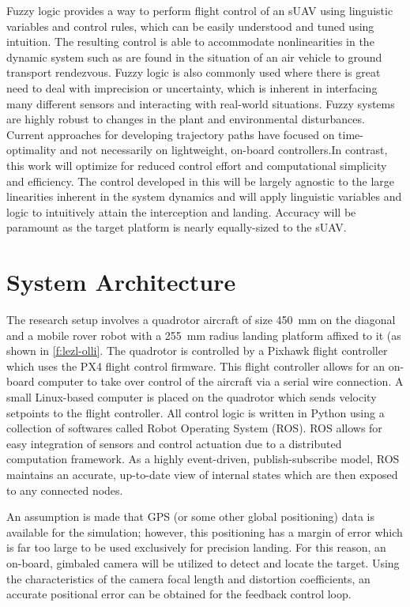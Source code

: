 \documentclass[]{aiaa-tc}
\begin{document}
Fuzzy logic provides a way to perform flight control of an sUAV using linguistic variables and control rules, which can be easily understood and tuned using intuition\cite{MAMDANI19751}. The resulting control is able to accommodate nonlinearities in the dynamic system such as are found in the situation of an air vehicle to ground transport rendezvous\cite{Ionita_2005}. Fuzzy logic is also commonly used where there is great need to deal with imprecision or uncertainty\cite{Matlab_fuzzy_tb,lee1990fuzzy}, which is inherent in interfacing many different sensors and interacting with real-world situations. Fuzzy systems are highly robust to changes in the plant and environmental disturbances\cite{Janson_2015}. Current approaches for developing trajectory paths have focused on time-optimality\cite{Adams_2012}\cite{Hehn_2012} and not necessarily on lightweight, on-board controllers.In contrast, this work will optimize for reduced control effort and computational simplicity and efficiency. The control developed in this will be largely agnostic to the large linearities inherent in the system dynamics and will apply linguistic variables and logic to intuitively attain the interception and landing. Accuracy will be paramount as the target platform is nearly equally-sized to the sUAV.

\section{System Architecture}
The research setup involves a quadrotor aircraft of size \SI{450}{\mm} on the diagonal and a mobile rover robot with a \SI{255}{mm} radius landing platform affixed to it (as shown in \cref{f:lezl-olli}. The quadrotor is controlled by a Pixhawk flight controller which uses the PX4 flight control firmware. This flight controller allows for an on-board computer to take over control of the aircraft via a serial wire connection. A small Linux-based computer is placed on the quadrotor which sends velocity setpoints to the flight controller. All control logic is written in Python using a collection of softwares called Robot Operating System (ROS). ROS allows for easy integration of sensors and control actuation due to a distributed computation framework. As a highly event-driven, publish-subscribe model, ROS maintains an accurate, up-to-date view of internal states which are then exposed to any connected nodes.

An assumption is made that GPS (or some other global positioning) data is available for the simulation; however, this positioning has a margin of error which is far too large to be used exclusively for precision landing. For this reason, an on-board, gimbaled camera will be utilized to detect and locate the target. Using the characteristics of the camera focal length and distortion coefficients, an accurate positional error can be obtained for the feedback control loop. 
\end{document}
